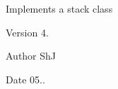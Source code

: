 Implements a stack class

\begin{DoxyVersion}{Version}
4.
\end{DoxyVersion}
\begin{DoxyAuthor}{Author}
ShJ 
\end{DoxyAuthor}
\begin{DoxyDate}{Date}
05.. 
\end{DoxyDate}
